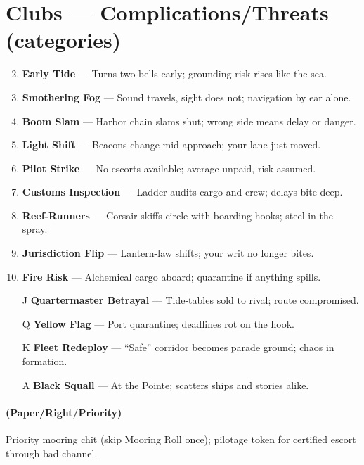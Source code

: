 \section*{Clubs --- Complications/Threats (categories)}
\label{sec:kahfagia-complications}
\begin{enumerate}
\setcounter{enumi}{1}
\item \textbf{Early Tide} --- Turns two bells early; grounding risk rises like the sea.
\item \textbf{Smothering Fog} --- Sound travels, sight does not; navigation by ear alone.
\item \textbf{Boom Slam} --- Harbor chain slams shut; wrong side means delay or danger.
\item \textbf{Light Shift} --- Beacons change mid-approach; your lane just moved.
\item \textbf{Pilot Strike} --- No escorts available; average unpaid, risk assumed.
\item \textbf{Customs Inspection} --- Ladder audits cargo and crew; delays bite deep.
\item \textbf{Reef-Runners} --- Corsair skiffs circle with boarding hooks; steel in the spray.
\item \textbf{Jurisdiction Flip} --- Lantern-law shifts; your writ no longer bites.
\item \textbf{Fire Risk} --- Alchemical cargo aboard; quarantine if anything spills.
\item[J] \textbf{Quartermaster Betrayal} --- Tide-tables sold to rival; route compromised.
\item[Q] \textbf{Yellow Flag} --- Port quarantine; deadlines rot on the hook.
\item[K] \textbf{Fleet Redeploy} --- ``Safe'' corridor becomes parade ground; chaos in formation.
\item[A] \textbf{Black Squall} --- At the Pointe; scatters ships and stories alike.
\end{enumerate}

\paragraph*{(Paper/Right/Priority)} Priority mooring chit (skip Mooring Roll once); pilotage token for certified escort through bad channel.

